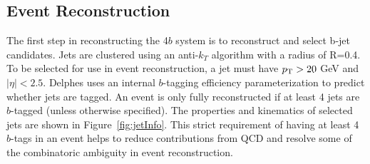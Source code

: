 \subsection{Event Reconstruction}
\label{sec:eventReco}
The first step in reconstructing the 4$b$ system is to reconstruct and select b-jet candidates. Jets are clustered using an anti-$k_T$ algorithm with a radius of R=0.4. To be selected for use in event reconstruction, a jet must have $p_{\text{T}} > 20$ GeV and $\mid\eta\mid < 2.5$. Delphes uses an internal $b$-tagging efficiency parameterization to predict whether jets are tagged. An event is only fully reconstructed if at least 4 jets are $b$-tagged (unless otherwise specified). The properties and kinematics of selected jets are shown in Figure~\ref{fig:jetInfo}. This strict requirement of having at least 4 $b$-tags in an event helps to reduce contributions from QCD and resolve some of the combinatoric ambiguity in event reconstruction.

